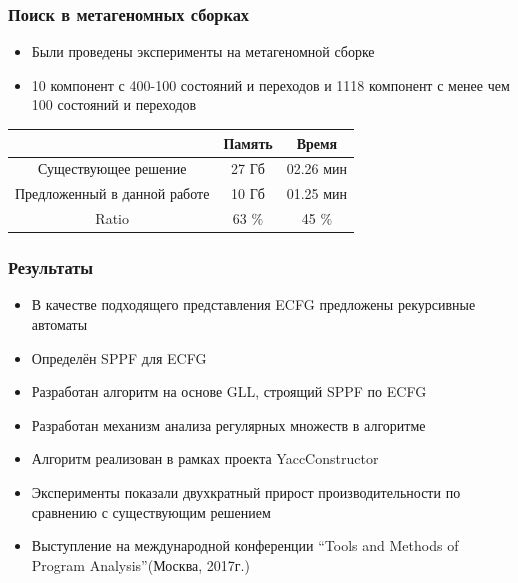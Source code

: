 \documentclass{beamer}
\begin{document}
	\begin{frame} 
		\frametitle{Поиск в метагеномных сборках} 
        \begin{itemize}
            \item Были проведены эксперименты на метагеномной сборке
            \item 10 компонент с 400-100 состояний и переходов и 1118 компонент с менее чем 100 состояний и переходов
        \end{itemize}
		\begin{center}
            
		\vspace{40pt}
		\begin{tabular}{ | c | c | c | }
			\hline
			             &  Память & Время   \\ \hline
			Существующее решение  &  27 Гб   & 02.26 мин \\ \hline
			Предложенный в данной работе &  10  Гб   &  01.25 мин \\ \hline \hline
			Ratio   &  63 $\%$     &  45 $\%$ \\ \hline
		\end{tabular}
		\end{center}
	\end{frame}

	\begin{frame} 
		\frametitle{Результаты}
		\begin{itemize}
			\item В качестве подходящего представления ECFG предложены рекурсивные автоматы
			\item Определён SPPF для ECFG
			\item Разработан алгоритм на основе GLL, строящий SPPF по ECFG
            \item Разработан механизм анализа регулярных множеств в алгоритме
			\item Алгоритм реализован в рамках проекта YaccConstructor
			\item Эксперименты показали двухкратный прирост производительности по сравнению с существующим решением 
			\item Выступление на международной конференции ``Tools and Methods of Program Analysis''(Москва, 2017г.)
		\end{itemize}		
	\end{frame}
\end{document}
